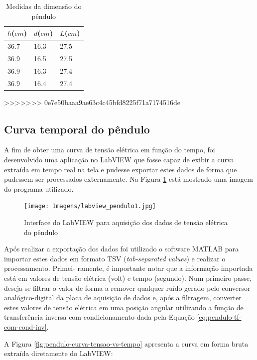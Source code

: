 \documentclass[a4paper]{instrumentacao}
\begin{document}
\begin{table}[H]
\centering
\caption{Medidas da dimensão do pêndulo}
\begin{tabular}{|l|l|l|}
 \hline
 \textbf{$h$($cm$)} & \textbf{$d$($cm$)} & \textbf{$L$($cm$)} \\ \hline

36.7 & 16.3 & 27.5 \\ \hline
36.9 & 16.5 & 27.5 \\ \hline
36.9 & 16.3 & 27.4 \\ \hline
36.9 & 16.4 & 27.4 \\ \hline

\end{tabular}
\label{tab:pendulo-dimensionamento}
\end{table}

>>>>>>> 0e7e50baaa9ae63c4c45bfd8225f71a7174516de

\subsection{Curva temporal do pêndulo}

A fim de obter uma curva de tensão elétrica em função do tempo, foi desenvolvido uma aplicação no LabVIEW que fosse capaz de exibir a curva extraída em tempo real na tela e pudesse exportar estes dados de forma que pudessem ser processados externamente. Na Figura \ref{fig:pendulo-LabVIEW} está mostrado uma imagem do programa utilizado.

\begin{figure}[H]
\centering
\texttt{[image: Imagens/labview\_pendulo1.jpg]}
\caption{Interface do LabVIEW para aquisição dos dados de tensão elétrica do pêndulo}
\label{fig:pendulo-LabVIEW}
\end{figure}

Após realizar a exportação dos dados foi utilizado o software MATLAB para importar estes dados em formato TSV (\textit{tab-separated values}) e realizar o processamento. Primei- ramente, é importante notar que a informação importada está em valores de tensão elétrica (volt) e tempo (segundo). Num primeiro passe, deseja-se filtrar o valor de forma a remover qualquer ruído gerado pelo conversor analógico-digital da placa de aquisição de dados e, após a filtragem, converter estes valores de tensão elétrica em uma posição angular utilizando a função de transferência inversa com condicionamento dada pela Equação \ref{eq:pendulo-tf-com-cond-inv}.

A Figura \ref{fig:pendulo-curva-tensao-vs-tempo} apresenta a curva em forma bruta extraída diretamente do LabVIEW:
\end{document}
